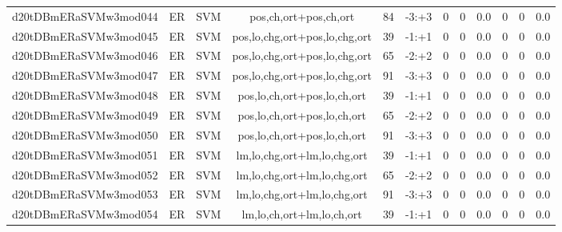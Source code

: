 \documentclass[a4paper]{article}
\begin{document}
\begin{landscape}
\begin{center}
\begin{tabular}{ |c|c|c|c|c|c|c|c|c|c|c|c|}
 
 	
 	\small{ d20tDBmERaSVMw3mod044 } & ER & SVM & pos,ch,ort+pos,ch,ort  &  84 &  -3:+3  &  0 & 0 & 0.0  &  0 & 0 & 0.0 \\
 	

 
 	
 	\small{ d20tDBmERaSVMw3mod045 } & ER & SVM & pos,lo,chg,ort+pos,lo,chg,ort  &  39 &  -1:+1  &  0 & 0 & 0.0  &  0 & 0 & 0.0 \\
 	

 
 	
 	\small{ d20tDBmERaSVMw3mod046 } & ER & SVM & pos,lo,chg,ort+pos,lo,chg,ort  &  65 &  -2:+2  &  0 & 0 & 0.0  &  0 & 0 & 0.0 \\
 	

 
 	
 	\small{ d20tDBmERaSVMw3mod047 } & ER & SVM & pos,lo,chg,ort+pos,lo,chg,ort  &  91 &  -3:+3  &  0 & 0 & 0.0  &  0 & 0 & 0.0 \\
 	

 
 	
 	\small{ d20tDBmERaSVMw3mod048 } & ER & SVM & pos,lo,ch,ort+pos,lo,ch,ort  &  39 &  -1:+1  &  0 & 0 & 0.0  &  0 & 0 & 0.0 \\
 	

 
 	
 	\small{ d20tDBmERaSVMw3mod049 } & ER & SVM & pos,lo,ch,ort+pos,lo,ch,ort  &  65 &  -2:+2  &  0 & 0 & 0.0  &  0 & 0 & 0.0 \\
 	

 
 	
 	\small{ d20tDBmERaSVMw3mod050 } & ER & SVM & pos,lo,ch,ort+pos,lo,ch,ort  &  91 &  -3:+3  &  0 & 0 & 0.0  &  0 & 0 & 0.0 \\
 	

 
 	
 	\small{ d20tDBmERaSVMw3mod051 } & ER & SVM & lm,lo,chg,ort+lm,lo,chg,ort  &  39 &  -1:+1  &  0 & 0 & 0.0  &  0 & 0 & 0.0 \\
 	

 
 	
 	\small{ d20tDBmERaSVMw3mod052 } & ER & SVM & lm,lo,chg,ort+lm,lo,chg,ort  &  65 &  -2:+2  &  0 & 0 & 0.0  &  0 & 0 & 0.0 \\
 	

 
 	
 	\small{ d20tDBmERaSVMw3mod053 } & ER & SVM & lm,lo,chg,ort+lm,lo,chg,ort  &  91 &  -3:+3  &  0 & 0 & 0.0  &  0 & 0 & 0.0 \\
 	

 
 	
 	\small{ d20tDBmERaSVMw3mod054 } & ER & SVM & lm,lo,ch,ort+lm,lo,ch,ort  &  39 &  -1:+1  &  0 & 0 & 0.0  &  0 & 0 & 0.0 \\
 	


\end{tabular}
\end{center}
\end{landscape}
\end{document}

